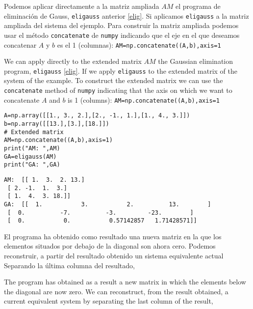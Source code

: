 \begin{paracol}{2}   
Podemos aplicar directamente a la matriz ampliada $AM$ el programa de eliminación de Gauss, \texttt{eligauss} anterior \ref{elig}. Si aplicamos \texttt{eligauss} a la matriz ampliada del sistema del ejemplo. Para construir la matriz ampliada podemos usar el método \texttt{concatenate} de  \texttt{numpy} indicando que el  eje en el que deseamos concatenar $A$ y $b$ es el 1 (columnas): \texttt{AM=np.concatenate((A,b),axis=1}

\switchcolumn

We can apply directly to the extended matrix $AM$ the Gaussian elimination program, \texttt{eligauss} \ref{elig}. If we apply \texttt{eligauss} to the extended matrix of the system of the example. 
To construct the extended matrix we can use the \texttt{concatenate} method of \texttt{numpy} indicating that the axis on which we want to concatenate $A$ and $b$ is 1 (columns): \texttt{AM=np.concatenate((A,b),axis=1}
\end{paracol}

\begin{verbatim}
A=np.array([[1., 3., 2.],[2., -1., 1.],[1., 4., 3.]])
b=np.array([[13.],[3.],[18.]])
# Extended matrix
AM=np.concatenate((A,b),axis=1)
print("AM: ",AM)
GA=eligauss(AM)
print("GA: ",GA)    
\end{verbatim}

\begin{verbatim}
AM:  [[ 1.  3.  2. 13.]
 [ 2. -1.  1.  3.]
 [ 1.  4.  3. 18.]]
GA:  [[  1.           3.           2.          13.        ]
 [  0.          -7.          -3.         -23.        ]
 [  0.           0.           0.57142857   1.71428571]]   
\end{verbatim}

\begin{paracol}{2}
El programa ha obtenido como resultado una nueva matriz en la que los elementos situados por debajo de la diagonal son ahora cero. Podemos reconstruir, a partir del resultado obtenido un sistema equivalente actual Separando la última columna del resultado,

\switchcolumn
The program has obtained as a result a new matrix in which the elements below the diagonal are now zero. We can reconstruct, from the result obtained, a current equivalent system by separating the last column of the result,
\end{paracol}

